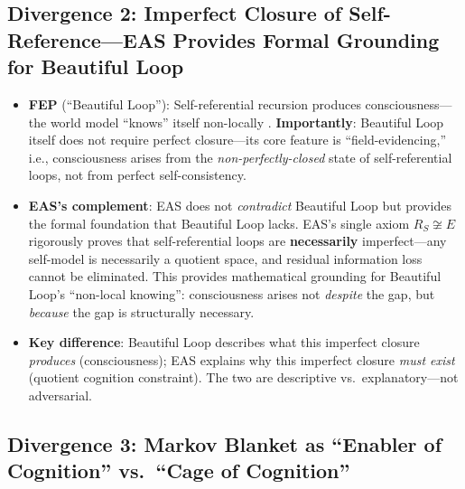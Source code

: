 \documentclass[11pt,a4paper]{article}
\begin{document}
\subsection{Divergence 2: Imperfect Closure of Self-Reference---EAS Provides Formal Grounding for Beautiful Loop}

\begin{itemize}[leftmargin=*]
\item \textbf{FEP} (``Beautiful Loop''): Self-referential recursion produces consciousness---the world model ``knows'' itself non-locally \cite{laukkonen2025}. \textbf{Importantly}: Beautiful Loop itself does not require perfect closure---its core feature is ``field-evidencing,'' i.e., consciousness arises from the \emph{non-perfectly-closed} state of self-referential loops, not from perfect self-consistency.
\item \textbf{EAS's complement}: EAS does not \emph{contradict} Beautiful Loop but provides the formal foundation that Beautiful Loop lacks. EAS's single axiom $R_S \not\cong E$ rigorously proves that self-referential loops are \textbf{necessarily} imperfect---any self-model is necessarily a quotient space, and residual information loss cannot be eliminated. This provides mathematical grounding for Beautiful Loop's ``non-local knowing'': consciousness arises not \emph{despite} the gap, but \emph{because} the gap is structurally necessary.
\item \textbf{Key difference}: Beautiful Loop describes what this imperfect closure \emph{produces} (consciousness); EAS explains why this imperfect closure \emph{must exist} (quotient cognition constraint). The two are descriptive vs.\ explanatory---not adversarial.
\end{itemize}

\subsection{Divergence 3: Markov Blanket as ``Enabler of Cognition'' vs.\ ``Cage of Cognition''}
\end{document}
